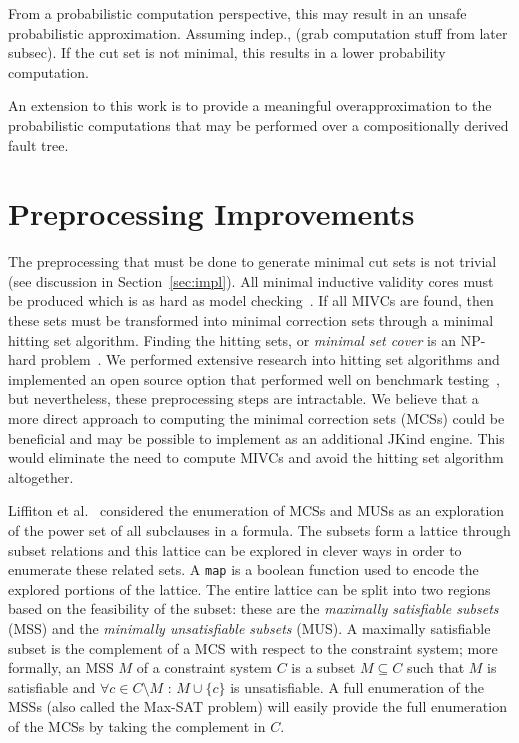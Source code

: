 From a probabilistic computation perspective, this may result in an unsafe probabilistic approximation. Assuming indep., (grab computation stuff from later subsec). If the cut set is not minimal, this results in a lower probability computation. 

An extension to this work is to provide a meaningful overapproximation to the probabilistic computations that may be performed over a compositionally derived fault tree. 

\section{Preprocessing Improvements}
\label{sec:preproc}
The preprocessing that must be done to generate minimal cut sets is not trivial (see discussion in Section~\ref{sec:impl}). All minimal inductive validity cores must be produced which is as hard as model checking~\cite{GhassabaniGW16}. If all MIVCs are found, then these sets must be transformed into minimal correction sets through a minimal hitting set algorithm. Finding the hitting sets, or {\em minimal set cover} is an NP-hard problem~\cite{gainer2017minimal,karp1972reducibility}.%
We performed extensive research into hitting set algorithms and implemented an open source option that performed well on benchmark testing~\cite{murakami2013efficient}, but nevertheless, these preprocessing steps are intractable. We believe that a more direct approach to computing the minimal correction sets (MCSs) could be beneficial and may be possible to implement as an additional JKind engine. This would eliminate the need to compute MIVCs and avoid the hitting set algorithm altogether. 

Liffiton et al.~\cite{liffiton2016fast} considered the enumeration of MCSs and MUSs as an exploration of the power set of all subclauses in a formula. The subsets form a lattice through subset relations and this lattice can be explored in clever ways in order to enumerate these related sets. A \texttt{map} is a boolean function used to encode the explored portions of the lattice. The entire lattice can be split into two regions based on the feasibility of the subset: these are the {\em maximally satisfiable subsets} (MSS) and the {\em minimally unsatisfiable subsets} (MUS). A maximally satisfiable subset is the complement of a MCS with respect to the constraint system; more formally, an MSS $M$ of a constraint system $C$ is a subset $M\subseteq C$ such that $M$ is satisfiable and $\forall c \in C \setminus M$ : $M \cup \{c\}$ is unsatisfiable. A full enumeration of the MSSs (also called the Max-SAT problem) will easily provide the full enumeration of the MCSs by taking the complement in $C$. 

